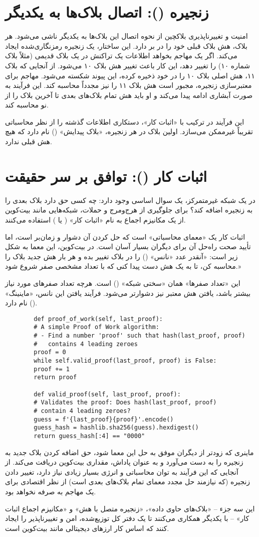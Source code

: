 \section{زنجیره (): اتصال بلاک‌ها به یکدیگر}

امنیت و تغییرناپذیری بلاکچین از نحوه اتصال این بلاک‌ها به یکدیگر ناشی می‌شود. هر بلاک، هش بلاک قبلی خود را در بر دارد. این ساختار، یک زنجیره رمزنگاری‌شده ایجاد می‌کند.
اگر یک مهاجم بخواهد اطلاعات یک تراکنش در یک بلاک قدیمی (مثلاً بلاک شماره ۱۰) را تغییر دهد، این کار باعث تغییر هش بلاک ۱۰ می‌شود. از آنجایی که بلاک ۱۱، هش اصلی بلاک ۱۰ را در خود ذخیره کرده، این پیوند شکسته می‌شود. مهاجم برای معتبرسازی زنجیره، مجبور است هش بلاک ۱۱ را نیز مجدداً محاسبه کند. این فرآیند به صورت آبشاری ادامه پیدا می‌کند و او باید هش تمام بلاک‌های بعدی تا آخرین بلاک را از نو محاسبه کند.

این فرآیند در ترکیب با «اثبات کار»، دستکاری اطلاعات گذشته را از نظر محاسباتی تقریباً غیرممکن می‌سازد. اولین بلاک در هر زنجیره، «بلاک پیدایش» () نام دارد که هیچ هش قبلی ندارد.

\section{اثبات کار (): توافق بر سر حقیقت}

در یک شبکه غیرمتمرکز، یک سوال اساسی وجود دارد: چه کسی حق دارد بلاک بعدی را به زنجیره اضافه کند؟ برای جلوگیری از هرج‌ومرج و حملات، شبکه‌هایی مانند بیت‌کوین از یک مکانیزم اجماع به نام «اثبات کار» ( یا ) استفاده می‌کنند.

اثبات کار یک «معمای محاسباتی» است که حل کردن آن دشوار و زمان‌بر است، اما تأیید صحت راه‌حل آن برای دیگران بسیار آسان است. در بیت‌کوین، این معما به شکل زیر است:
«آنقدر عدد «نانس» () را در بلاک تغییر بده و هر بار هش جدید بلاک را محاسبه کن، تا به یک هش دست پیدا کنی که با تعداد مشخصی صفر شروع شود.»

این «تعداد صفرها» همان «سختی شبکه» () است. هرچه تعداد صفرهای مورد نیاز بیشتر باشد، یافتن هش معتبر نیز دشوارتر می‌شود. فرآیند یافتن این نانس، «ماینینگ» () نام دارد.
\begin{latin}
	\begin{lstlisting}
		def proof_of_work(self, last_proof):
		# A simple Proof of Work algorithm:
		# - Find a number 'proof' such that hash(last_proof, proof)
		#   contains 4 leading zeroes
		proof = 0
		while self.valid_proof(last_proof, proof) is False:
		proof += 1
		return proof
		
		def valid_proof(self, last_proof, proof):
		# Validates the proof: Does hash(last_proof, proof) 
		# contain 4 leading zeroes?
		guess = f'{last_proof}{proof}'.encode()
		guess_hash = hashlib.sha256(guess).hexdigest()
		return guess_hash[:4] == "0000"
	\end{lstlisting}
\end{latin}
ماینری که زودتر از دیگران موفق به حل این معما شود، حق اضافه کردن بلاک جدید به زنجیره را به دست می‌آورد و به عنوان پاداش، مقداری بیت‌کوین دریافت می‌کند. از آنجایی که این فرآیند به توان محاسباتی و انرژی بسیار زیادی نیاز دارد، تغییر دادن زنجیره (که نیازمند حل مجدد معمای تمام بلاک‌های بعدی است) از نظر اقتصادی برای یک مهاجم به صرفه نخواهد بود.

این سه جزء -- «بلاک‌های حاوی داده»، «زنجیره متصل با هش» و «مکانیزم اجماع اثبات کار» -- با یکدیگر همکاری می‌کنند تا یک دفتر کل توزیع‌شده، امن و تغییرناپذیر را ایجاد کنند که اساس کار ارزهای دیجیتالی مانند بیت‌کوین است.